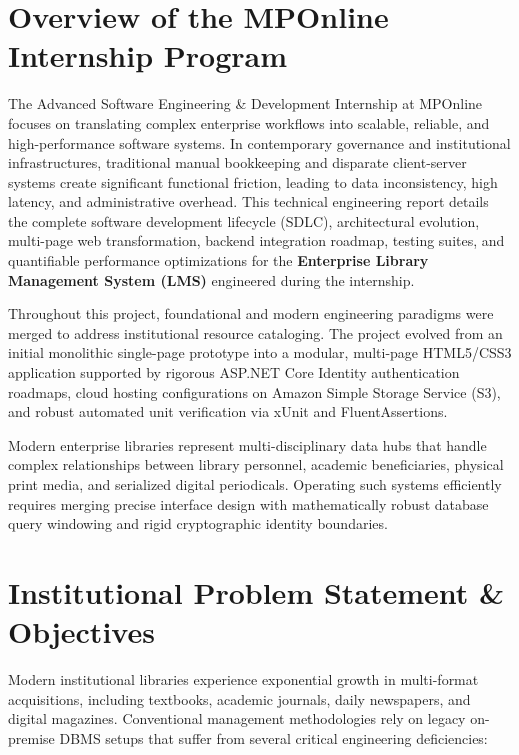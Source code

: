 \documentclass[11pt,a4paper]{report}
\begin{document}
\section{Overview of the MPOnline Internship Program}
The Advanced Software Engineering \& Development Internship at MPOnline focuses on translating complex enterprise workflows into scalable, reliable, and high-performance software systems. In contemporary governance and institutional infrastructures, traditional manual bookkeeping and disparate client-server systems create significant functional friction, leading to data inconsistency, high latency, and administrative overhead. This technical engineering report details the complete software development lifecycle (SDLC), architectural evolution, multi-page web transformation, backend integration roadmap, testing suites, and quantifiable performance optimizations for the \textbf{Enterprise Library Management System (LMS)} engineered during the internship.

Throughout this project, foundational and modern engineering paradigms were merged to address institutional resource cataloging. The project evolved from an initial monolithic single-page prototype into a modular, multi-page HTML5/CSS3 application supported by rigorous ASP.NET Core Identity authentication roadmaps, cloud hosting configurations on Amazon Simple Storage Service (S3), and robust automated unit verification via xUnit and FluentAssertions.

Modern enterprise libraries represent multi-disciplinary data hubs that handle complex relationships between library personnel, academic beneficiaries, physical print media, and serialized digital periodicals. Operating such systems efficiently requires merging precise interface design with mathematically robust database query windowing and rigid cryptographic identity boundaries.

\section{Institutional Problem Statement \& Objectives}
Modern institutional libraries experience exponential growth in multi-format acquisitions, including textbooks, academic journals, daily newspapers, and digital magazines. Conventional management methodologies rely on legacy on-premise DBMS setups that suffer from several critical engineering deficiencies:
\end{document}
